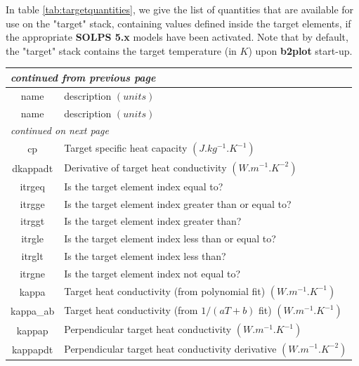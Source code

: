 \documentclass[a4paper,10pt]{report}
\newcommand\SOLPSfive{{\bf SOLPS 5.x} }
\newcommand{\btwoplot}{{\bf b2plot} }
\begin{document}
In table \ref{tab:targetquantities}, we give the list of quantities that
are available for use on the "target" stack, containing values defined
inside the target elements, if the appropriate \SOLPSfive models have been
activated. Note that by default, the "target" stack contains the target
temperature (in $K$) upon \btwoplot start-up.

\begin{center}
  \begin{longtable}{|c|l|}
    \hline
    \multicolumn{2}{|l|}{\small\sl continued from previous page} \\
    \hline name & description $(units)$ \\
    \hline \endhead
    \hline name & description $(units)$ \\
    \hline \endfirsthead
    \hline
    \multicolumn{2}{|l|}{\small\sl continued on next page} \\
    \hline \endfoot
    \endlastfoot
    cp \index{b2plot, cp}        & Target specific heat capacity $(J.kg^{-1}.K^{-1})$ \\
    dkappadt \index{b2plot, dkappadt}  & Derivative of target heat conductivity $(W.m^{-1}.K^{-2})$ \\
    itrgeq \index{b2plot, itrgeq}    & Is the target element index equal to? \\
    itrgge \index{b2plot, itrgge}    & Is the target element index greater
    than or equal to? \\
    itrggt \index{b2plot, itrggt}    & Is the target element index greater than? \\
    itrgle \index{b2plot, itrgle}    & Is the target element index less than
    or equal to? \\
    itrglt \index{b2plot, itrglt}    & Is the target element index less than? \\
    itrgne \index{b2plot, itrgne}    & Is the target element index not equal to? \\
    kappa \index{b2plot, kappa}     & Target heat conductivity (from polynomial fit) $(W.m^{-1}.K^{-1})$ \\
    kappa\_ab \index{b2plot, kappa\_ab} & Target heat conductivity (from $1/(aT+b)$ fit) $(W.m^{-1}.K^{-1})$ \\
    kappap \index{b2plot, kappap}    & Perpendicular target heat conductivity $(W.m^{-1}.K^{-1})$ \\
    kappapdt \index{b2plot, kappapdt}  & Perpendicular target heat conductivity derivative $(W.m^{-1}.K^{-2})$ \\

\end{longtable}
\end{center}
\end{document}
